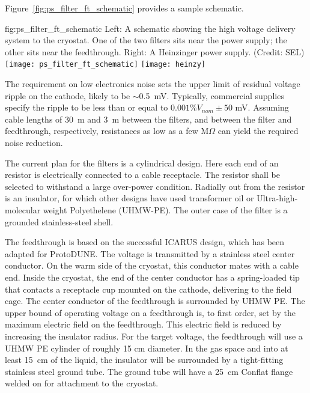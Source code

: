 Figure~\ref{fig:ps_filter_ft_schematic} provides a sample schematic.

\begin{dunefigure}{fig:ps_filter_ft_schematic}
{Left:  A schematic showing the high voltage delivery system to the cryostat.  %
One of the two filters sits near the power supply; the other sits near the feedthrough. Right:  %
A Heinzinger power supply.  (Credit: SEL)}
\texttt{[image: ps\_filter\_ft\_schematic]}
\texttt{[image: heinzy]}
\end{dunefigure}
The requirement %
on low electronics noise sets the upper limit of residual voltage ripple on the cathode, likely to be $\sim$\SI{0.5}{mV}.  Typically, commercial supplies %
specify the ripple to be less than or equal to $0.001\%V_{nom} \pm 50$ mV.  Assuming cable lengths of \SI{30}{m} and \SI{3}{m} between the filters, and between the filter and feedthrough, respectively, resistances as low as a few M$\Omega$ can yield the required noise reduction. %

The current plan for the filters is a cylindrical design.  %
Here each end of an  resistor is electrically connected to a cable receptacle. 
The resistor %
shall be selected to withstand a large over-power condition.  Radially out from the resistor is an insulator,  %
for which other designs have used transformer oil or Ultra-high-molecular weight Polyethelene (UHMW-PE).  The outer case of the filter is a grounded stainless-steel shell. 

The  feedthrough %
is based on the successful ICARUS design, which has been adapted for ProtoDUNE.  The voltage is transmitted by a stainless steel center conductor.  On the warm side of the cryostat, this conductor mates with a cable end.  Inside the cryostat, the end of the center conductor has a spring-loaded tip that %
contacts a receptacle cup mounted on the cathode, delivering  to the field cage.  The center conductor of the feedthrough is surrounded by UHMW PE. 
 The upper bound of operating voltage on a feedthrough is, to first order, set by the maximum electric field on the feedthrough.  This electric field is reduced by increasing the insulator radius.  For the target voltage, the feedthrough will use a UHMW PE cylinder of roughly 15 cm diameter.  In the gas space and into at least \SI{15}{\centi\meter} of the liquid, the insulator will be surrounded by a tight-fitting stainless steel ground tube.  The ground tube will have a \SI{25}{\centi\meter}  Conflat flange  welded on for attachment to the cryostat.


